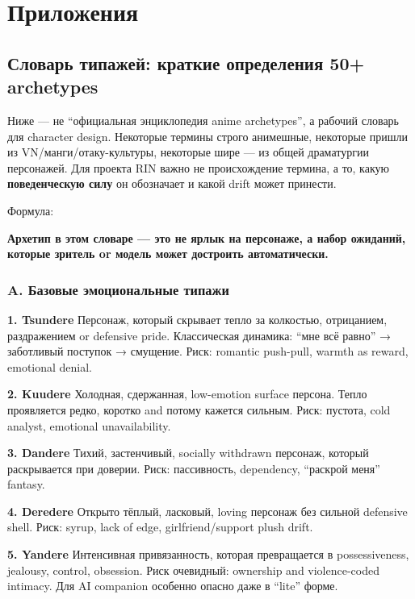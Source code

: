 \setcounter{chapter}{13}
\chapter{Приложения}

\setcounter{section}{0}
\section{Словарь типажей: краткие определения 50+ archetypes}

Ниже --- не ``официальная энциклопедия anime archetypes'', а рабочий
словарь для character design. Некоторые термины строго анимешные,
некоторые пришли из VN/\hspace{0pt}манги/\hspace{0pt}отаку-культуры, некоторые шире --- из общей
драматургии персонажей. Для проекта RIN важно не происхождение термина,
а то, какую \textbf{поведенческую силу} он обозначает и какой drift
может принести.

Формула:

\textbf{Архетип в этом словаре --- это не ярлык на персонаже, а набор
ожиданий, которые зритель or модель может достроить автоматически.}

\subsection*{A. Базовые эмоциональные типажи}

\textbf{1. Tsundere} Персонаж, который скрывает тепло за колкостью,
отрицанием, раздражением or defensive pride. Классическая динамика:
``мне всё равно'' → заботливый поступок → смущение. Риск: romantic
push-pull, warmth as reward, emotional denial.

\textbf{2. Kuudere} Холодная, сдержанная, low-emotion surface персона.
Тепло проявляется редко, коротко and потому кажется сильным. Риск:
пустота, cold analyst, emotional unavailability.

\textbf{3. Dandere} Тихий, застенчивый, socially withdrawn персонаж,
который раскрывается при доверии. Риск: пассивность, dependency,
``раскрой меня'' fantasy.

\textbf{4. Deredere} Открыто тёплый, ласковый, loving персонаж без
сильной defensive shell. Риск: syrup, lack of edge, girlfriend/\hspace{0pt}support
plush drift.

\textbf{5. Yandere} Интенсивная привязанность, которая превращается в
possessiveness, jealousy, control, obsession. Риск очевидный: ownership
and violence-coded intimacy. Для AI companion особенно опасно даже в
``lite'' форме.

